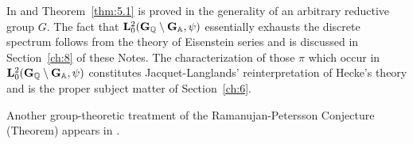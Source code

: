 In \cite{Langlands} and \cite{Godement2} Theorem~\ref{thm:5.1} is proved in the generality of an arbitrary reductive group $G$. The fact that $\mathbf{L}_0^2(\mathbf{G}_{\mathbb{Q}} \setminus \mathbf{G}_{\mathbb{A}}, \psi)$ essentially exhausts the discrete spectrum follows from the theory of Eisenstein series and is discussed in Section~\ref{ch:8} of these Notes. The characterization of those $\pi$ which occur in $\mathbf{L}_0^2(\mathbf{G}_{\mathbb{Q}} \setminus \mathbf{G}_{\mathbb{A}}, \psi)$ constitutes Jacquet-Langlands' reinterpretation of Hecke's theory and is the proper subject matter of Section~\ref{ch:6}.

Another group-theoretic treatment of the Ramanujan-Petersson Conjecture (Theorem) appears in \cite{Satake}.
